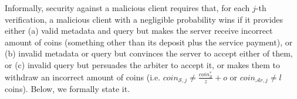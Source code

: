 
 
 
 
Informally, security against a malicious client requires that, for each  $j$-th verification, a malicious client with a negligible probability  wins if it provides either (a) valid metadata and query but makes the server receive incorrect amount of coins (something other than its deposit plus the service payment), or (b) invalid metadata or query but convinces the server to accept either of them, or (c) invalid query but persuades the arbiter to accept it, or  makes them to withdraw an incorrect amount of coins (i.e. $coin_{\scriptscriptstyle\mathcal{S},j}\neq \frac{coin_{\scriptscriptstyle\mathcal S}^{\scriptscriptstyle*}}{z}+o$ or  $coin_{\scriptscriptstyle\mathcal{A}r,j}\neq l$ coins). Below, we formally state it. 
 
 
 
